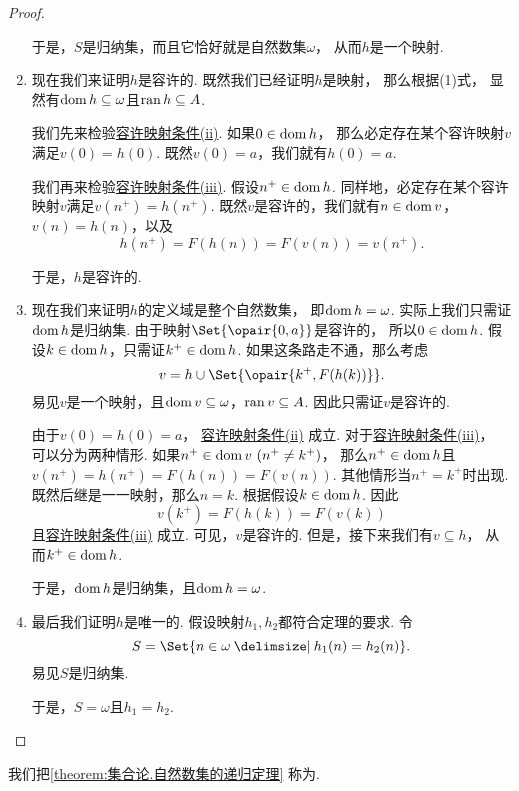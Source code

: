 \begin{theorem}
\begin{proof}
\begin{enumerate}
	于是，\(S\)是归纳集，而且它恰好就是自然数集\(\omega\)，
	从而\(h\)是一个映射.

	\item 现在我们来证明\(h\)是容许的.
	既然我们已经证明\(h\)是映射，
	那么根据(1)式，
	显然有\(\operatorname{dom} h \subseteq \omega\)且\(\operatorname{ran} h \subseteq A\).

	我们先来检验\hyperref[item:集合论.容许映射条件2]{容许映射条件(ii)}.
	如果\(0 \in \operatorname{dom} h\)，
	那么必定存在某个容许映射\(v\)满足\(v(0) = h(0)\).
	既然\(v(0) = a\)，我们就有\(h(0) = a\).

	我们再来检验\hyperref[item:集合论.容许映射条件3]{容许映射条件(iii)}.
	假设\(n^+ \in \operatorname{dom} h\).
	同样地，必定存在某个容许映射\(v\)满足\(v(n^+) = h(n^+)\).
	既然\(v\)是容许的，我们就有\(n \in \operatorname{dom} v\)，\(v(n) = h(n)\)，以及\[
		h(n^+) = F(h(n)) = F(v(n)) = v(n^+).
	\]

	于是，\(h\)是容许的.

	\item 现在我们来证明\(h\)的定义域是整个自然数集，
	即\(\operatorname{dom} h = \omega\).
	实际上我们只需证\(\operatorname{dom} h\)是归纳集.
	由于映射\(\Set{\opair{0,a}}\)是容许的，
	所以\(0 \in \operatorname{dom} h\).
	假设\(k \in \operatorname{dom} h\)，只需证\(k^+ \in \operatorname{dom} h\).
	如果这条路走不通，那么考虑\[
		v = h \cup \Set{\opair{k^+,F(h(k))}}.
	\]
	易见\(v\)是一个映射，且\(\operatorname{dom} v \subseteq \omega\)，\(\operatorname{ran} v \subseteq A\).
	因此只需证\(v\)是容许的.

	由于\(v(0) = h(0) = a\)，
	\hyperref[item:集合论.容许映射条件2]{容许映射条件(ii)} 成立.
	对于\hyperref[item:集合论.容许映射条件3]{容许映射条件(iii)}，
	可以分为两种情形.
	如果\(n^+ \in \operatorname{dom} v\ (n^+ \neq k^+)\)，
	那么\(n^+ \in \operatorname{dom} h\)且\(v(n^+) = h(n^+) = F(h(n)) = F(v(n))\).
	其他情形当\(n^+ = k^+\)时出现.
	既然后继是一一映射，那么\(n=k\).
	根据假设\(k \in \operatorname{dom} h\).
	因此\[
		v(k^+) = F(h(k)) = F(v(k))
	\]
	且\hyperref[item:集合论.容许映射条件3]{容许映射条件(iii)} 成立.
	可见，\(v\)是容许的.
	但是，接下来我们有\(v \subseteq h\)，
	从而\(k^+ \in \operatorname{dom} h\).

	于是，\(\operatorname{dom} h\)是归纳集，且\(\operatorname{dom} h = \omega\).

	\item 最后我们证明\(h\)是唯一的.
	假设映射\(h_1,h_2\)都符合定理的要求.
	令\[
		S = \Set{ n \in \omega \given h_1(n) = h_2(n) }.
	\]
	易见\(S\)是归纳集.

	于是，\(S = \omega\)且\(h_1 = h_2\).
\end{enumerate}
\end{proof}
\end{theorem}
我们把\cref{theorem:集合论.自然数集的递归定理} 称为.

